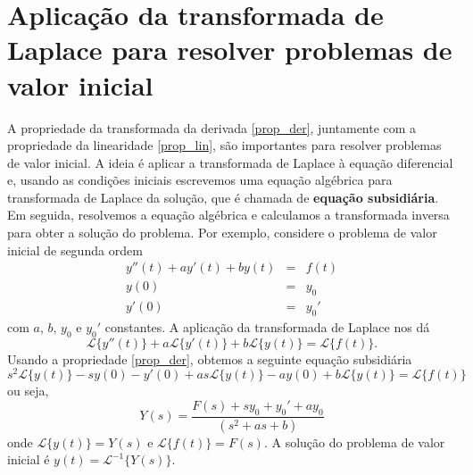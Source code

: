 \section{Aplicação da transformada de Laplace para resolver problemas de valor inicial}
A propriedade da transformada da derivada \ref{prop_der}, juntamente com a propriedade da linearidade \ref{prop_lin}, são importantes para resolver problemas de valor inicial. A ideia é aplicar a transformada de Laplace à equação diferencial e, usando as condições iniciais escrevemos uma equação algébrica para transformada de Laplace da solução, que é chamada de {\bf equação subsidiária}. Em seguida, resolvemos a equação algébrica e calculamos a transformada inversa para obter a solução do problema. Por exemplo, considere o problema de valor inicial de segunda ordem
\begin{eqnarray*}
 y''(t)+ay'(t)+by(t)&=&f(t)\\
y(0)&=&y_0\\
y'(0)&=&y_0'
\end{eqnarray*}
com $a$, $b$, $y_0$ e $y_0'$ constantes. A aplicação da transformada de Laplace nos dá
 \begin{equation}
 \mathcal{L}\{y''(t)\}+a \mathcal{L}\{y'(t)\}+b \mathcal{L}\{y(t)\}= \mathcal{L}\{f(t)\}.
\end{equation}
Usando a propriedade \ref{prop_der}, obtemos a seguinte equação subsidiária
 \begin{equation}
 s^2\mathcal{L}\{y(t)\}-sy(0)-y'(0)+a s\mathcal{L}\{y(t)\}-ay(0)+b \mathcal{L}\{y(t)\}= \mathcal{L}\{f(t)\}
\end{equation}
ou seja,
 \begin{equation}
 Y(s)=\frac{F(s)+sy_0+y_0'+ay_0}{(s^2+as+b)}
\end{equation}
onde $\mathcal{L}\{y(t)\}=Y(s)$ e $\mathcal{L}\{f(t)\}=F(s)$. A solução do problema de valor inicial é  $y(t)=\mathcal{L}^{-1}\{Y(s)\}$.
